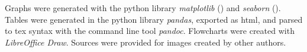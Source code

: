 Graphs were generated with the python library \textit{matplotlib} (\cite{hunter2007})
and \textit{seaborn} (\cite{bisong2019}).
Tables were generated in the python library \textit{pandas},
exported as html, 
and parsed to tex syntax with the command line tool \textit{pandoc}.
Flowcharts were created with \textit{LibreOffice Draw}.
Sources were provided for images created by other authors.

